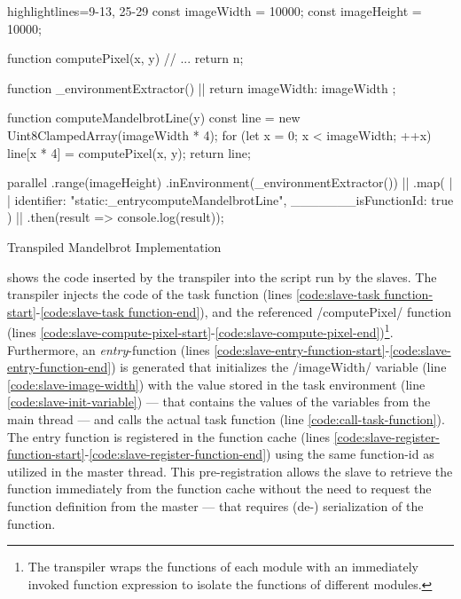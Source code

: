 \begin{listing}
	\begin{javascriptcode*}{highlightlines={9-13, 25-29}}
const imageWidth = 10000;
const imageHeight = 10000;

function computePixel(x, y) {
	// ...
	return n;
}

function _environmentExtractor() { |$\label{code:mandelbrot-environment-extractor}$|
	return {
		imageWidth: imageWidth
	};
}

function computeMandelbrotLine(y) {
	const line = new Uint8ClampedArray(imageWidth * 4);
	for (let x = 0; x < imageWidth; ++x) {
		line[x * 4] = computePixel(x, y);
	}
	return line;
}

parallel
	.range(imageHeight)
	.inEnvironment(_environmentExtractor()) |$\label{code:mandelbrot-environment-call}$|
	.map({ |$\label{code:mandelbrot-function-id-start}$|
		identifier: "static:_entrycomputeMandelbrotLine",
		_______isFunctionId: true
	}) |$\label{code:mandelbrot-function-id-end}$|
	.then(result => console.log(result));
\end{javascriptcode*}
\caption{Transpiled Mandelbrot Implementation}
\label{fig:mandelbrot-transpiled}
\end{listing}


 shows the code inserted by the transpiler into the script run by the slaves. The transpiler injects the code of the task function (lines \ref{code:slave-task function-start}-\ref{code:slave-task function-end}), and the referenced \javascriptinline/computePixel/ function (lines \ref{code:slave-compute-pixel-start}-\ref{code:slave-compute-pixel-end})\footnote{The transpiler wraps the functions of each module with an immediately invoked function expression to isolate the functions of different modules.}. Furthermore, an \textit{entry}-function (lines \ref{code:slave-entry-function-start}-\ref{code:slave-entry-function-end}) is generated that initializes the \javascriptinline/imageWidth/ variable (line \ref{code:slave-image-width}) with the value stored in the task environment (line \ref{code:slave-init-variable}) --- that contains the values of the variables from the main thread --- and calls the actual task function (line \ref{code:call-task-function}). The entry function is registered in the function cache (lines \ref{code:slave-register-function-start}-\ref{code:slave-register-function-end}) using the same function-id as utilized in the master thread. This pre-registration allows the slave to retrieve the function immediately from the function cache without the need to request the function definition from the master --- that requires (de-) serialization of the function.

